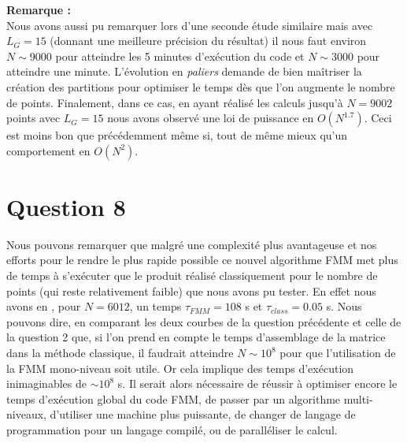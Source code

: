 \documentclass[10pt]{article}
\begin{document}
\begin{multicols}{2}
\noindent
\textbf{{\small Remarque :}} \\
Nous avons aussi pu remarquer lors d'une seconde étude similaire mais avec $L_G = 15$ (donnant une meilleure précision du résultat) il nous faut environ $N \sim 9000$ pour atteindre les 5 minutes d’exécution du code et $N \sim 3000$ pour atteindre une minute. L'évolution en \textit{paliers} demande de bien maîtriser la création des partitions pour optimiser le temps dès que l'on augmente le nombre de points. Finalement, dans ce cas, en ayant réalisé les calculs jusqu'à $N=9002$ points avec $L_G = 15$ nous avons observé une loi de puissance en $O(N^{1.7})$. Ceci est moins bon que précédemment même si, tout de même mieux qu'un comportement en $O(N^{2})$.



\vspace*{11pt}
\section*{Question 8}

Nous pouvons remarquer que malgré une complexité plus avantageuse et nos efforts pour le rendre le plus rapide possible ce nouvel algorithme FMM met plus de temps à s’exécuter que le produit réalisé classiquement pour le nombre de points (qui reste relativement faible) que nous avons pu tester. En effet nous avons en , pour $N = 6012$, un temps $\tau_{FMM} = 108$ s et $\tau_{class} = 0.05$ s. Nous pouvons dire, en comparant les deux courbes de la question précédente et celle de la question 2 que, si l'on prend en compte le temps d'assemblage de la matrice dans la méthode classique, il faudrait atteindre $N \sim 10^{8}$ pour que l'utilisation de la FMM mono-niveau soit utile. Or cela implique des temps d'exécution inimaginables de $\sim 10^{8}$ s. Il serait alors nécessaire de réussir à optimiser encore le temps d’exécution global du code FMM, de passer par un algorithme multi-niveaux, d'utiliser une machine plus puissante, de changer de langage de programmation pour un langage compilé, ou de paralléliser le calcul.








\end{multicols}
\end{document}
